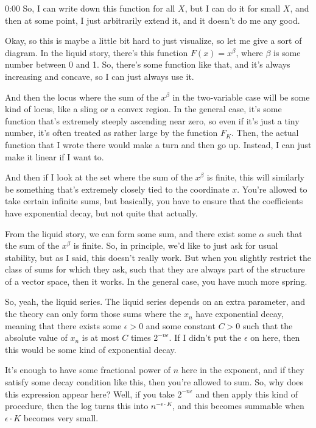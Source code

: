 \begin{unfinished}{0:00}
So, I can write down this function for all $X$, but I can do it for small $X$, and then at some point, I just arbitrarily extend it, and it doesn't do me any good.

Okay, so this is maybe a little bit hard to just visualize, so let me give a sort of diagram. In the liquid story, there's this function $F(x) = x^{\beta}$, where $\beta$ is some number between 0 and 1. So, there's some function like that, and it's always increasing and concave, so I can just always use it.

And then the locus where the sum of the $x^{\beta}$ in the two-variable case will be some kind of locus, like a sling or a convex region. In the general case, it's some function that's extremely steeply ascending near zero, so even if it's just a tiny number, it's often treated as rather large by the function $F_K$. Then, the actual function that I wrote there would make a turn and then go up. Instead, I can just make it linear if I want to.

And then if I look at the set where the sum of the $x^{\beta}$ is finite, this will similarly be something that's extremely closely tied to the coordinate $x$. You're allowed to take certain infinite sums, but basically, you have to ensure that the coefficients have exponential decay, but not quite that actually.

From the liquid story, we can form some sum, and there exist some $\alpha$ such that the sum of the $x^{\beta}$ is finite. So, in principle, we'd like to just ask for usual stability, but as I said, this doesn't really work. But when you slightly restrict the class of sums for which they ask, such that they are always part of the structure of a vector space, then it works. In the general case, you have much more spring.

So, yeah, the liquid series. The liquid series depends on an extra parameter, and the theory can only form those sums where the $x_n$ have exponential decay, meaning that there exists some $\epsilon > 0$ and some constant $C > 0$ such that the absolute value of $x_n$ is at most $C$ times $2^{-n\epsilon}$. If I didn't put the $\epsilon$ on here, then this would be some kind of exponential decay.

It's enough to have some fractional power of $n$ here in the exponent, and if they satisfy some decay condition like this, then you're allowed to sum. So, why does this expression appear here? Well, if you take $2^{-n\epsilon}$ and then apply this kind of procedure, then the log turns this into $n^{-\epsilon\cdot K}$, and this becomes summable when $\epsilon\cdot K$ becomes very small.


\end{unfinished}

